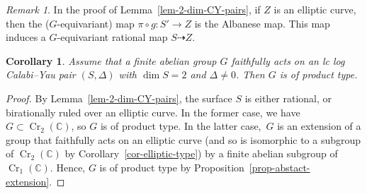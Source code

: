 \documentclass[11pt]{amsart}
\numberwithin{equation}{section}
\newtheorem{corollary}[thm]{Corollary}
\theoremstyle{definition}
\theoremstyle{remark}
\newtheorem{remark}[thm]{Remark}
\DeclareMathOperator{\Cr}{Cr}
\begin{document}
\begin{remark}
\label{rem-albanese-map}
In the proof of Lemma~\ref{lem-2-dim-CY-pairs}, if $Z$ is an elliptic curve, then the ($G$-equivariant) map $\pi\circ g\colon S'\to Z$ is the Albanese map. This map induces a $G$-equivariant rational map $S\dashrightarrow Z$.
\end{remark}

\begin{corollary}
\label{cor-2-dim-cy-pair-pt}
Assume that a finite abelian group $G$ faithfully acts on an lc log Calabi--Yau pair $(S, \Delta)$ with $\dim S=2$ and $\Delta\neq 0$. Then $G$ is of product type.
\end{corollary}

\begin{proof}
By Lemma~\ref{lem-2-dim-CY-pairs}, the surface $S$ is either rational, or birationally ruled over an elliptic curve. In the former case, we have $G\subset\Cr_2(\mathbb{C})$, so $G$ is of product type. In the latter case,~$G$ is an extension of a group that faithfully acts on an elliptic curve (and so is isomorphic to a subgroup of $\Cr_2(\mathbb{C})$ by Corollary~\ref{cor-elliptic-type}) by a finite abelian subgroup of $\Cr_1(\mathbb{C})$. Hence, $G$ is of product type by Proposition~\ref{prop-abstact-extension}.
\end{proof}
\end{document}
